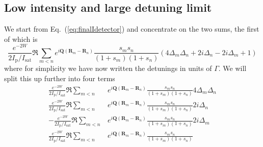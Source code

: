 \documentclass[11pt,letter]{article}
\newcommand{\bv}[1]{\ensuremath{\bm{#1}}}
\begin{document}
\subsection{ Low intensity and large detuning limit}
We start from Eq.~(\ref{eq:finalIdetector}) and concentrate on the two sums, the first of which is 
\begin{equation} 
  \frac{  e^{-2W}}{2I_{\mathrm{p}}/I_{\mathrm{sat}}} \Re 
  \sum_{m<n} 
               e^{ i \bv{Q}( \bv{R}_{m} - \bv{R}_{n} ) } 
    \frac{ s_{m} s_{n} } {( 1+s_{m} )( 1+s_{n} ) }
    \left(
         4\Delta_{m} \Delta_{n} 
      + 2i \Delta_{n} 
      - 2i \Delta_{m}
      + 1
    \right)  
\end{equation}
where for simplicity we have now written the detunings in units of $\Gamma$.  We will split this up further into four terms 
\begin{align} 
  \frac{  e^{-2W}}{2I_{\mathrm{p}}/I_{\mathrm{sat}}} \Re \sum_{m<n} & 
      e^{ i \bv{Q}( \bv{R}_{m} - \bv{R}_{n} ) } 
      \frac{ s_{m} s_{n} } {( 1+s_{m} )( 1+s_{n} ) } 4 \Delta_{m} \Delta_{n} \\
  \frac{  e^{-2W}}{2I_{\mathrm{p}}/I_{\mathrm{sat}}} \Re \sum_{m<n} & 
      e^{ i \bv{Q}( \bv{R}_{m} - \bv{R}_{n} ) } 
      \frac{ s_{m} s_{n} } {( 1+s_{m} )( 1+s_{n} ) } 2 i \Delta_{n}  \\
  -\frac{  e^{-2W}}{2I_{\mathrm{p}}/I_{\mathrm{sat}}} \Re \sum_{m<n} & 
      e^{ i \bv{Q}( \bv{R}_{m} - \bv{R}_{n} ) } 
      \frac{ s_{m} s_{n} } {( 1+s_{m} )( 1+s_{n} ) } 2 i \Delta_{m}  \\
  \frac{  e^{-2W}}{2I_{\mathrm{p}}/I_{\mathrm{sat}}} \Re \sum_{m<n} & 
      e^{ i \bv{Q}( \bv{R}_{m} - \bv{R}_{n} ) } 
      \frac{ s_{m} s_{n} } {( 1+s_{m} )( 1+s_{n} ) }   
\end{align}
\end{document}
